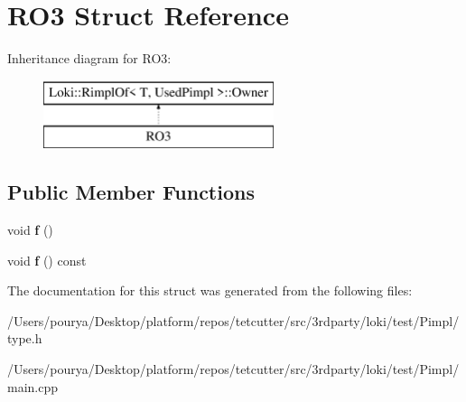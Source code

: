 \hypertarget{structRO3}{}\section{R\+O3 Struct Reference}
\label{structRO3}
Inheritance diagram for R\+O3\+:\begin{figure}[H]
\begin{center}
\leavevmode
\includegraphics[height=2.000000cm]{structRO3}
\end{center}
\end{figure}
\subsection*{Public Member Functions}
\begin{DoxyCompactItemize}
\item 
\hypertarget{structRO3_adb45fa7ceb1df52d15121ae85c4d2daf}{}void {\bfseries f} ()\label{structRO3_adb45fa7ceb1df52d15121ae85c4d2daf}

\item 
\hypertarget{structRO3_ad51d31e496b544f6d6deca46be349dd9}{}void {\bfseries f} () const \label{structRO3_ad51d31e496b544f6d6deca46be349dd9}

\end{DoxyCompactItemize}


The documentation for this struct was generated from the following files\+:\begin{DoxyCompactItemize}
\item 
/\+Users/pourya/\+Desktop/platform/repos/tetcutter/src/3rdparty/loki/test/\+Pimpl/type.\+h\item 
/\+Users/pourya/\+Desktop/platform/repos/tetcutter/src/3rdparty/loki/test/\+Pimpl/main.\+cpp\end{DoxyCompactItemize}
